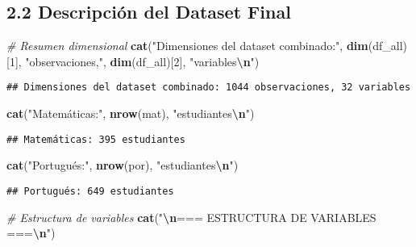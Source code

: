 \documentclass[
]{book}
\newenvironment{Shaded}{\begin{snugshade}}{\end{snugshade}}
\newcommand{\CommentTok}[1]{\textcolor[rgb]{0.56,0.35,0.01}{\textit{#1}}}
\newcommand{\DecValTok}[1]{\textcolor[rgb]{0.00,0.00,0.81}{#1}}
\newcommand{\FunctionTok}[1]{\textcolor[rgb]{0.13,0.29,0.53}{\textbf{#1}}}
\newcommand{\NormalTok}[1]{#1}
\newcommand{\SpecialCharTok}[1]{\textcolor[rgb]{0.81,0.36,0.00}{\textbf{#1}}}
\newcommand{\StringTok}[1]{\textcolor[rgb]{0.31,0.60,0.02}{#1}}
\begin{document}
\subsection{2.2 Descripción del Dataset Final}\label{descripciuxf3n-del-dataset-final}

\begin{Shaded}
\begin{Highlighting}[]
\CommentTok{\# Resumen dimensional}
\FunctionTok{cat}\NormalTok{(}\StringTok{"Dimensiones del dataset combinado:"}\NormalTok{, }\FunctionTok{dim}\NormalTok{(df\_all)[}\DecValTok{1}\NormalTok{], }\StringTok{"observaciones,"}\NormalTok{, }\FunctionTok{dim}\NormalTok{(df\_all)[}\DecValTok{2}\NormalTok{], }\StringTok{"variables}\SpecialCharTok{\textbackslash{}n}\StringTok{"}\NormalTok{)}
\end{Highlighting}
\end{Shaded}

\begin{verbatim}
## Dimensiones del dataset combinado: 1044 observaciones, 32 variables
\end{verbatim}

\begin{Shaded}
\begin{Highlighting}[]
\FunctionTok{cat}\NormalTok{(}\StringTok{"Matemáticas:"}\NormalTok{, }\FunctionTok{nrow}\NormalTok{(mat), }\StringTok{"estudiantes}\SpecialCharTok{\textbackslash{}n}\StringTok{"}\NormalTok{)}
\end{Highlighting}
\end{Shaded}

\begin{verbatim}
## Matemáticas: 395 estudiantes
\end{verbatim}

\begin{Shaded}
\begin{Highlighting}[]
\FunctionTok{cat}\NormalTok{(}\StringTok{"Portugués:"}\NormalTok{, }\FunctionTok{nrow}\NormalTok{(por), }\StringTok{"estudiantes}\SpecialCharTok{\textbackslash{}n}\StringTok{"}\NormalTok{)}
\end{Highlighting}
\end{Shaded}

\begin{verbatim}
## Portugués: 649 estudiantes
\end{verbatim}

\begin{Shaded}
\begin{Highlighting}[]
\CommentTok{\# Estructura de variables}
\FunctionTok{cat}\NormalTok{(}\StringTok{"}\SpecialCharTok{\textbackslash{}n}\StringTok{=== ESTRUCTURA DE VARIABLES ===}\SpecialCharTok{\textbackslash{}n}\StringTok{"}\NormalTok{)}
\end{Highlighting}
\end{Shaded}
\end{document}
